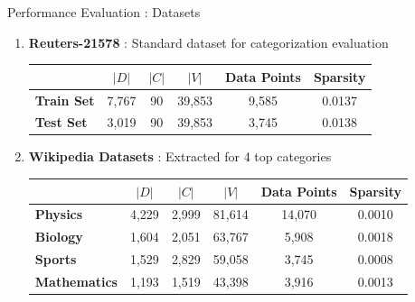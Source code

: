 \documentclass[10pt]{beamer}
\newcommand{\setD}{\ensuremath{D} }
\newcommand{\setW}{\ensuremath{V} }
\newcommand{\setC}{\ensuremath{C} }
\begin{document}
\begin{frame}{Performance Evaluation : Datasets }

\begin{enumerate}
	\vfill\item<1-> \textbf{Reuters-21578} : Standard dataset for categorization evaluation
	\vfill	\begin{table}[h!]
	\scriptsize
	\begin{center}
	\begin{tabular}{l c c c c c} %
	\toprule
	& \textbf{$|\setD|$} & \textbf{$|\setC|$} & \textbf{$|\setW|$} & \textbf{Data Points} & \textbf{Sparsity}\\
	\midrule
	\textbf{Train Set}	& 7,767 & 90 & 39,853 & 9,585 & 0.0137 \\
	\textbf{Test Set}	& 3,019 & 90 & 39,853 & 3,745 & 0.0138 \\
	\bottomrule         
	\end{tabular}
	\end{center}
	\end{table}
	\vfill\item<2-> \textbf{Wikipedia Datasets} : Extracted for 4 top categories
	\vfill \begin{table}[h!]
	\scriptsize
	\begin{center}
	\begin{tabular}{l c c c c c} %
	\toprule
	& \textbf{$|\setD|$} & \textbf{$|\setC|$} & \textbf{$|\setW|$} & \textbf{Data Points} & \textbf{Sparsity}\\
	\midrule
	\textbf{Physics}		& 4,229 & 2,999 & 81,614 & 14,070 & 0.0010 \\
	\textbf{Biology}		& 1,604 & 2,051 & 63,767 & 5,908 & 0.0018 \\
	\textbf{Sports}			& 1,529 & 2,829 & 59,058 & 3,745 & 0.0008 \\
	\textbf{Mathematics}	& 1,193 & 1,519 & 43,398 & 3,916 & 0.0013 \\
	\bottomrule         
	\end{tabular}
	\end{center}
	\end{table}
	\end{enumerate}
\end{frame}
\end{document}
